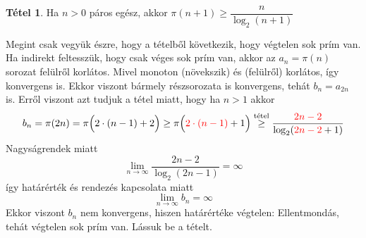 \documentclass[12pt]{book}
\theoremstyle{plain} %
\theoremstyle{definition} %
\newtheorem{theo/}{Tétel}[section]
\newenvironment{theo}
  {\renewcommand{\qedsymbol}{$\clubsuit$}%
   \pushQED{\qed}\begin{theo/}}
  {\popQED\end{theo/}}
\theoremstyle{remark}
\renewcommand\qedsymbol{$\blacksquare$}
\numberwithin{equation}{section}  %
\begin{document}
	\begin{theo}
		Ha $n>0$ páros egész, akkor $\pi(n+1) \geq \dfrac{n}{\log_2 (n+1)}$
	\end{theo}

	Megint csak vegyük észre, hogy a tételből következik, hogy végtelen sok prím van. Ha indirekt feltesszük, hogy csak véges sok prím van, akkor az $a_n = \pi(n)$ sorozat felülről korlátos. Mivel monoton (növekszik) és (felülről) korlátos, így konvergens is. Ekkor viszont bármely részsorozata is konvergens, tehát $b_n = a_{2n}$ is. Erről viszont azt tudjuk a tétel miatt, hogy ha $n>1$ akkor
	\[ b_n = \pi(2n) = \pi\Big(2\cdot (n-1) + 2\Big) \geq \pi\Big(\color{red}2 \cdot (n-1)\color{black} + 1\Big) \stackrel{\text{tétel}}{\geq} \dfrac{\color{red}2n-2\color{black}}{\log_2 (\color{red}2n-2\color{black} + 1)}  \]
	Nagyságrendek miatt
	\[ \lim\limits_{n\to \infty} \dfrac{2n-2}{\log_2 (2n-1)} = \infty  \]
	így határérték és rendezés kapcsolata miatt
	\[ \lim\limits_{n\to \infty} b_n = \infty  \]
	Ekkor viszont $b_n$ nem konvergens, hiszen határértéke végtelen: Ellentmondás, tehát végtelen sok prím van. Lássuk be a tételt.
	
\end{document}
